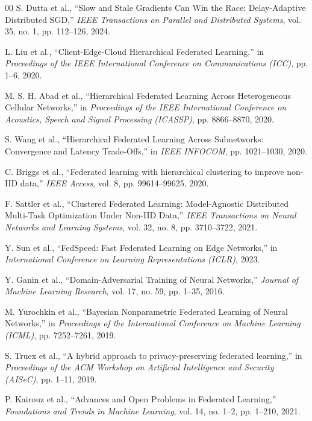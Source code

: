 \documentclass[conference]{IEEEtran}
\begin{document}
\begin{thebibliography}{00}
 S. Dutta et al., ``Slow and Stale Gradients Can Win the Race: Delay-Adaptive Distributed SGD,'' \textit{IEEE Transactions on Parallel and Distributed Systems}, vol. 35, no. 1, pp. 112--126, 2024.

 L. Liu et al., ``Client-Edge-Cloud Hierarchical Federated Learning,'' in \textit{Proceedings of the IEEE International Conference on Communications (ICC)}, pp. 1--6, 2020.

 M. S. H. Abad et al., ``Hierarchical Federated Learning Across Heterogeneous Cellular Networks,'' in \textit{Proceedings of the IEEE International Conference on Acoustics, Speech and Signal Processing (ICASSP)}, pp. 8866--8870, 2020.

 S. Wang et al., ``Hierarchical Federated Learning Across Subnetworks: Convergence and Latency Trade-Offs,'' in \textit{IEEE INFOCOM}, pp. 1021--1030, 2020.

 C. Briggs et al., ``Federated learning with hierarchical clustering to improve non-IID data,'' \textit{IEEE Access}, vol. 8, pp. 99614--99625, 2020.

 F. Sattler et al., ``Clustered Federated Learning: Model-Agnostic Distributed Multi-Task Optimization Under Non-IID Data,'' \textit{IEEE Transactions on Neural Networks and Learning Systems}, vol. 32, no. 8, pp. 3710--3722, 2021.

 Y. Sun et al., ``FedSpeed: Fast Federated Learning on Edge Networks,'' in \textit{International Conference on Learning Representations (ICLR)}, 2023.

 Y. Ganin et al., ``Domain-Adversarial Training of Neural Networks,'' \textit{Journal of Machine Learning Research}, vol. 17, no. 59, pp. 1--35, 2016.

 M. Yurochkin et al., ``Bayesian Nonparametric Federated Learning of Neural Networks,'' in \textit{Proceedings of the International Conference on Machine Learning (ICML)}, pp. 7252--7261, 2019.

 S. Truex et al., ``A hybrid approach to privacy-preserving federated learning,'' in \textit{Proceedings of the ACM Workshop on Artificial Intelligence and Security (AISeC)}, pp. 1--11, 2019.

 P. Kairouz et al., ``Advances and Open Problems in Federated Learning,'' \textit{Foundations and Trends in Machine Learning}, vol. 14, no. 1--2, pp. 1--210, 2021.

\end{thebibliography}
\end{document}
